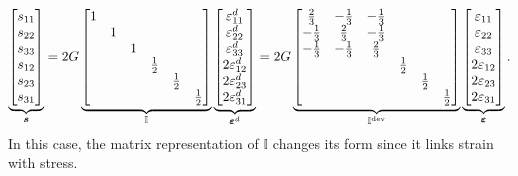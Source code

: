 \begin{gather}\label{eq:dev_tensor_se}
\underbrace{\begin{bmatrix}
s_{11}\\
s_{22}\\
s_{33}\\
s_{12}\\
s_{23}\\
s_{31}
\end{bmatrix}}_{\bm{s}}
=
2G\underbrace{\begin{bmatrix}
1&&&&&\\
&1&&&&\\
&&1&&&\\
&&&\frac{1}{2}&&\\
&&&&\frac{1}{2}&\\
&&&&&\frac{1}{2}
\end{bmatrix}}_{\mathbb{I}}
\underbrace{\begin{bmatrix}
\varepsilon^d_{11}\\
\varepsilon^d_{22}\\
\varepsilon^d_{33}\\
2\varepsilon^d_{12}\\
2\varepsilon^d_{23}\\
2\varepsilon^d_{31}
\end{bmatrix}}_{\bm{\varepsilon}^d}
=
2G\underbrace{\begin{bmatrix}
\frac{2}{3}&-\frac{1}{3}&-\frac{1}{3}&&&\\
-\frac{1}{3}&\frac{2}{3}&-\frac{1}{3}&&&\\
-\frac{1}{3}&-\frac{1}{3}&\frac{2}{3}&&&\\
&&&\frac{1}{2}&&\\
&&&&\frac{1}{2}&\\
&&&&&\frac{1}{2}
\end{bmatrix}}_{\mathbb{I^\text{dev}}}
\underbrace{\begin{bmatrix}
\varepsilon_{11}\\
\varepsilon_{22}\\
\varepsilon_{33}\\
2\varepsilon_{12}\\
2\varepsilon_{23}\\
2\varepsilon_{31}
\end{bmatrix}}_{\bm{\varepsilon}}.
\end{gather}
In this case, the matrix representation of $\mathbb{I}$ changes its form since it links strain with stress.

